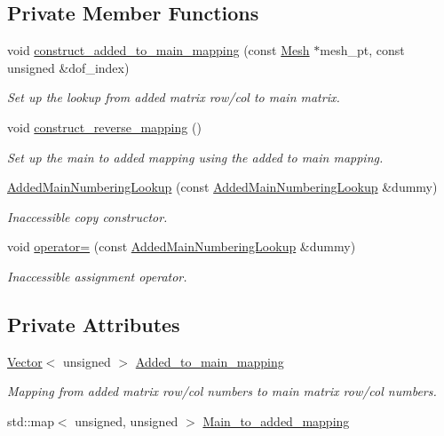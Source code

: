 \subsection*{Private Member Functions}
\begin{DoxyCompactItemize}
\item 
void \hyperlink{classoomph_1_1AddedMainNumberingLookup_a9fb7ccbac5f6339de912449531e69cba}{construct\+\_\+added\+\_\+to\+\_\+main\+\_\+mapping} (const \hyperlink{classoomph_1_1Mesh}{Mesh} $\ast$mesh\+\_\+pt, const unsigned \&dof\+\_\+index)
\begin{DoxyCompactList}\small\item\em Set up the lookup from added matrix row/col to main matrix. \end{DoxyCompactList}\item 
void \hyperlink{classoomph_1_1AddedMainNumberingLookup_a4ec4ec12b1dc296741d228be01deb96f}{construct\+\_\+reverse\+\_\+mapping} ()
\begin{DoxyCompactList}\small\item\em Set up the main to added mapping using the added to main mapping. \end{DoxyCompactList}\item 
\hyperlink{classoomph_1_1AddedMainNumberingLookup_a97713d9017f25616e315b85d869db35a}{Added\+Main\+Numbering\+Lookup} (const \hyperlink{classoomph_1_1AddedMainNumberingLookup}{Added\+Main\+Numbering\+Lookup} \&dummy)
\begin{DoxyCompactList}\small\item\em Inaccessible copy constructor. \end{DoxyCompactList}\item 
void \hyperlink{classoomph_1_1AddedMainNumberingLookup_a9ccd56aeaa1b14bd688dac407b05f381}{operator=} (const \hyperlink{classoomph_1_1AddedMainNumberingLookup}{Added\+Main\+Numbering\+Lookup} \&dummy)
\begin{DoxyCompactList}\small\item\em Inaccessible assignment operator. \end{DoxyCompactList}\end{DoxyCompactItemize}
\subsection*{Private Attributes}
\begin{DoxyCompactItemize}
\item 
\hyperlink{classoomph_1_1Vector}{Vector}$<$ unsigned $>$ \hyperlink{classoomph_1_1AddedMainNumberingLookup_a6c172dfd7d00b7af01c83e46b072955b}{Added\+\_\+to\+\_\+main\+\_\+mapping}
\begin{DoxyCompactList}\small\item\em Mapping from added matrix row/col numbers to main matrix row/col numbers. \end{DoxyCompactList}\item 
std\+::map$<$ unsigned, unsigned $>$ \hyperlink{classoomph_1_1AddedMainNumberingLookup_ac37dc1a1c43aec35b3cdf57a6aaf838c}{Main\+\_\+to\+\_\+added\+\_\+mapping}
\end{DoxyCompactItemize}


